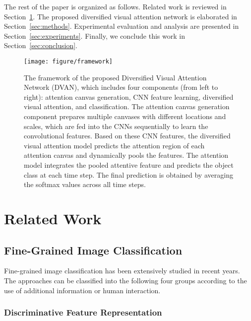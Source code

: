 \documentclass[journal]{IEEEtran}
\begin{document}
The rest of the paper is organized as follows. Related work is reviewed in Section~\ref{sec:related_work}. The proposed diversified visual attention network is elaborated in Section~\ref{sec:methods}. Experimental evaluation and analysis are presented in Section~\ref{sec:experiments}. Finally, we conclude this work in Section~\ref{sec:conclusion}.

\begin{figure*}[t]
  \centering
  \texttt{[image: figure/framework]}
  \vspace{-0.1in}
  \caption{The framework of the proposed Diversified Visual Attention Network (DVAN), which includes four components (from left to right): attention canvas generation, CNN feature learning, diversified visual attention, and classification. The attention canvas generation component prepares multiple canvases with different locations and scales, which are fed into the CNNs sequentially to learn the convolutional features. Based on these CNN features, the diversified visual attention model predicts the attention region of each attention canvas and dynamically pools the features. The attention model integrates the pooled attentive feature and predicts the object class at each time step. The final prediction is obtained by averaging the softmax values across all time steps.}
  \label{fig:framework}
  \vspace{-0.2in}
\end{figure*}

\section{Related Work}
\label{sec:related_work}

\subsection{Fine-Grained Image Classification}

Fine-grained image classification has been extensively studied in recent years. The approaches can be classified into the following four groups according to the use of additional information or human interaction.

\subsubsection{Discriminative Feature Representation}
\end{document}
